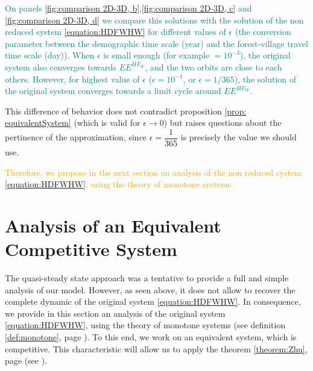 \documentclass{article}
\newcommand{\vdeux}[1]{\textcolor{orange}{#1}}
\newcommand{\vquatre}[1]{\textcolor{teal}{#1}}
\theoremstyle{definition}
\theoremstyle{remark}
\begin{document}
\vquatre{
On panels \ref{fig:comparison 2D-3D, b},\ref{fig:comparison 2D-3D, c} and \ref{fig:comparison 2D-3D, d} we compare this solutions with the solution of the non reduced system \eqref{equation:HDFWHW} for different values of $\epsilon$ (the conversion parameter between the demographic time scale (year) and the forest-village travel time scale (day)). When $\epsilon$ is small enough (for example $= 10^{-3}$), the original system also converges towards $EE^{HF_W}$, and the two orbits are close to each others.
However, for highest value of $\epsilon$ ($\epsilon = 10^{-1}$, or $\epsilon = 1/365 $), the solution of the original system converges towards a limit cycle around $EE^{HF_W}$.
}

This difference of behavior does not contradict proposition \ref{prop: equivalentSystem} (which is valid for $\epsilon \rightarrow 0$) but raises questions about the pertinence of the approximation, since $\epsilon = \dfrac{1}{365}$ is precisely the value we should use. 

\vdeux{Therefore, we propose in the next section an analysis of the non reduced system \eqref{equation:HDFWHW}, using the theory of monotone systems.}

\section{Analysis of an Equivalent Competitive System} \label{sec:competitive}
The quasi-steady state approach was a tentative to provide a full and simple analysis of our model. However, as seen above, it does not allow to recover the complete dynamic of the original system \eqref{equation:HDFWHW}. In consequence, we provide in this section an analysis of the original system \eqref{equation:HDFWHW}, using the theory of monotone systems (see definition \ref{def:monotone}, page \pageref{def:monotone}). To this end, we work on an equivalent system, which is competitive. This characteristic will allow us to apply the theorem \ref{theorem:Zhu}, page \pageref{theorem:Zhu} (see \cite{zhu_stable_1994}).
\end{document}
